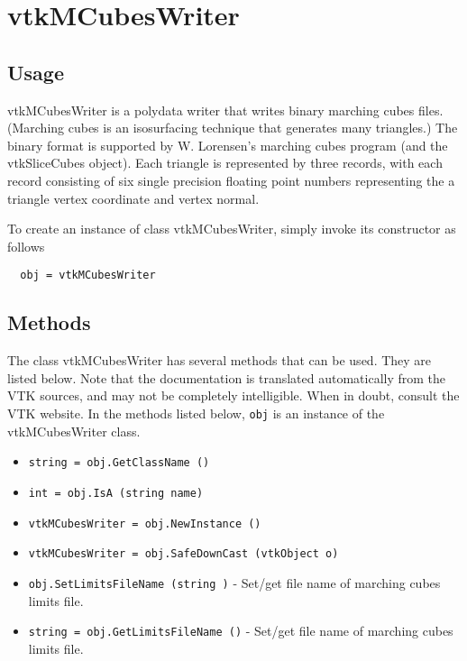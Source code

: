 \section{vtkMCubesWriter}

\subsection{Usage}

 vtkMCubesWriter is a polydata writer that writes binary marching cubes
 files. (Marching cubes is an isosurfacing technique that generates many
 triangles.) The binary format is supported by W. Lorensen's marching cubes
 program (and the vtkSliceCubes object). Each triangle is represented by
 three records, with each record consisting of six single precision
 floating point numbers representing the a triangle vertex coordinate and
 vertex normal.

To create an instance of class vtkMCubesWriter, simply
invoke its constructor as follows
\begin{verbatim}
  obj = vtkMCubesWriter
\end{verbatim}
\subsection{Methods}

The class vtkMCubesWriter has several methods that can be used.
  They are listed below.
Note that the documentation is translated automatically from the VTK sources,
and may not be completely intelligible.  When in doubt, consult the VTK website.
In the methods listed below, \verb|obj| is an instance of the vtkMCubesWriter class.
\begin{itemize}
\item  \verb|string = obj.GetClassName ()|

\item  \verb|int = obj.IsA (string name)|

\item  \verb|vtkMCubesWriter = obj.NewInstance ()|

\item  \verb|vtkMCubesWriter = obj.SafeDownCast (vtkObject o)|

\item  \verb|obj.SetLimitsFileName (string )| -  Set/get file name of marching cubes limits file.

\item  \verb|string = obj.GetLimitsFileName ()| -  Set/get file name of marching cubes limits file.

\end{itemize}
